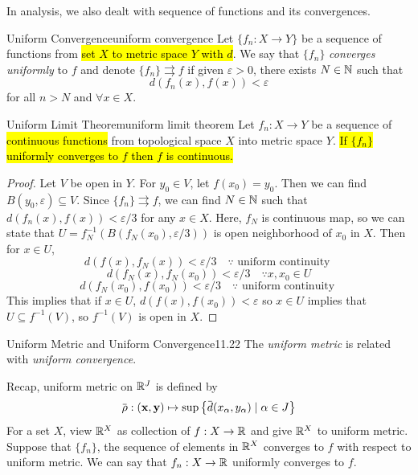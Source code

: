 \documentclass[12pt, a4paper, twoside]{article}
\newcommand{\overbar}[1]{\mkern 1.5mu\overline{\mkern-1.5mu#1\mkern-1.5mu}\mkern 1.5mu}
\theoremstyle{plain}
\begin{document}
In analysis, we also dealt with sequence of functions and its convergences. 

\newpage 

\begin{defn}{Uniform Convergence}{uniform convergence}
    Let $\{f_n: X \rightarrow Y\}$ be a sequence of functions from \hl{set $X$ to metric space $Y$ with $d$}. 
    We say that $\{f_n\}$ \textit{converges uniformly} to $f$ and denote $\{f_n\} \rightrightarrows f$ 
    if given $\varepsilon > 0$, there exists $N \in {\mathbb {N}}$ such that 
    \[d(f_n(x), f(x)) < \varepsilon\]
    for all $n > N$ and $\forall x \in X$. 
\end{defn}

\begin{thm}{Uniform Limit Theorem}{uniform limit theorem}
    Let $f_n: X \rightarrow Y$ be a sequence of \hl{continuous functions} from topological space $X$ into metric space $Y$. \hl{If $\{f_n\}$ uniformly converges to $f$ then $f$ is continuous.}
\end{thm}

\begin{proof}
    Let $V$ be open in $Y$. For $y_0 \in V$, let $f(x_0) = y_0$. Then we can find $B(y_0, \varepsilon) \subseteq V$. 
    Since $\{f_n\} \rightrightarrows f$, we can find $N \in {\mathbb {N}}$ such that $d(f_n(x), f(x)) < \varepsilon/3$ for any $x \in X$. 
    Here, $f_N$ is continuous map, so we can state that $U = f^{-1}_N(B(f_N(x_0), \varepsilon/3))$ is open neighborhood of $x_0$ in $X$. 
    Then for $x \in U$, 
    \[d(f(x), f_N(x)) < \varepsilon/3 \quad \because \text{ uniform continuity }\]
    \[d(f_N(x), f_N(x_0)) < \varepsilon/3 \quad \because x, x_0 \in U\]
    \[d(f_N(x_0), f(x_0)) < \varepsilon/3 \quad \because \text{ uniform continuity }\]
    This implies that if $x \in U$, $d(f(x), f(x_0)) < \varepsilon$ so $x \in U$ implies that $U \subseteq f^{-1}(V)$, so $f^{-1}(V)$ is open in $X$. 
\end{proof}

\begin{rem}{Uniform Metric and Uniform Convergence}{11.22}
    The \textit{uniform metric} is related with \textit{uniform convergence}. 
\end{rem}

Recap, uniform metric on ${\mathbb {R}}^J$ is defined by 
\[\overbar{\rho}: (\mathbf{x}, \mathbf{y}) \mapsto \sup \left\{\overbar{d}(x_\alpha, y_\alpha) \mid \alpha \in J\right\}\]
For a set $X$, view ${\mathbb {R}}^X$ as collection of $f: X \rightarrow {\mathbb {R}}$ and give ${\mathbb {R}}^X$ to uniform metric. 
Suppose that $\{f_n\}$, the sequence of elements in ${\mathbb {R}}^X$ converges to $f$ with respect to uniform metric. 
We can say that $f_n: X \rightarrow {\mathbb {R}}$ uniformly converges to $f$. 
\end{document}
